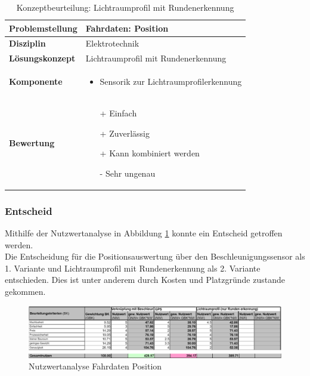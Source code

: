 \documentclass[../../main.tex]{subfiles}
\begin{document}
    \begin{flushleft}
        \begin{table}[H]
        \begin{tabular}{ | l | p{11cm} |}
        \hline
        \textbf{Problemstellung} & Fahrdaten: Position \\ \hline
        \textbf{Disziplin} & Elektrotechnik \\ \hline
        \textbf{Lösungskonzept} & Lichtraumprofil mit Rundenerkennung\\ \hline
        \textbf{Komponente} & \begin{itemize}
            \item Sensorik zur Lichtraumprofilerkennung
            \end{itemize}\\ \hline
        \textbf{Bewertung} &  \begin{itemize}
                                \item[+] Einfach
                                \item[+] Zuverlässig
                                \item[+] Kann kombiniert werden
                                \item[-] Sehr ungenau
                              \end{itemize} \\ \hline
        \end{tabular}
        \caption{Konzeptbeurteilung: Lichtraumprofil mit Rundenerkennung}
        \label{tab:fahr_pos_Lichtraumprofilerkennung}
    \end{table}
    \end{flushleft}

    \subsubsection{Entscheid}
    Mithilfe der Nutzwertanalyse in Abbildung \ref{fig:fahr_nutzwertanalyse_positiont} konnte ein Entscheid getroffen werden.\\
    Die Entscheidung für die Positionsauswertung über den Beschleunigungssensor als 1. Variante und Lichtraumprofil mit Rundenerkennung als 2. Variante entschieden. Dies ist unter anderem durch Kosten und Platzgründe zustande gekommen. 
        
    \begin{figure}[H]
        \centering
        \includegraphics[width=1.0\textwidth]{Nutzweranalyse_Fahrdaten_Position.png}
        \caption {Nutzwertanalyse Fahrdaten Position}
        \label{fig:fahr_nutzwertanalyse_positiont}
    \end{figure}


    
\end{document}
